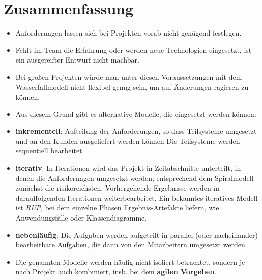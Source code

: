 \section{Zusammenfassung}

\begin{itemize}
    \item Anforderungen lassen sich bei Projekten vorab nicht genügend festlegen.
    \item Fehlt im Team die Erfahrung oder werden neue Technologien eingesetzt, ist ein ausgereifter Entwurf nicht machbar.
    \item Bei großen Projekten würde man unter diesen Voraussetzungen mit dem Wasserfallmodell nicht flexibel genug sein,
    um auf Änderungen ragieren zu können.
    \item Aus diesem Grund gibt es alternative Modelle, die eingesetzt werden können:
    \item \textbf{inkrementell}: Aufteilung der Anforderungen, so dass Teilsysteme umgesetzt und an den Kunden ausgeliefert werden können
    Die Teilsysteme werden sequentiell bearbeitet.
    \item \textbf{iterativ}: In Iterationen wird das Projekt in Zeitabschnitte unterteilt, in denen die Anforderungen umgesetzt werden; entsprechend dem Spiralmodell zunächst die risikoreichsten.
    Vorhergehende Ergebnisse werden in darauffolgenden Iterationen weiterbearbeitet.
    Ein bekanntes iteratives Modell ist \textit{RUP}, bei dem einzelne Phasen Ergebnis-Artefakte liefern, wie Anwendungsfälle oder Klassendiagramme.
    \item \textbf{nebenläufig}: Die Aufgaben werden aufgeteilt in parallel (oder nacheinander) bearbeitbare Aufgaben, die dann von den Mitarbeitern umgesetzt werden.
    \item Die genannten Modelle werden häufig nicht isoliert betrachtet, sondern je nach Projekt auch kombiniert, insb. bei dem \textbf{agilen Vorgehen}.
\end{itemize}